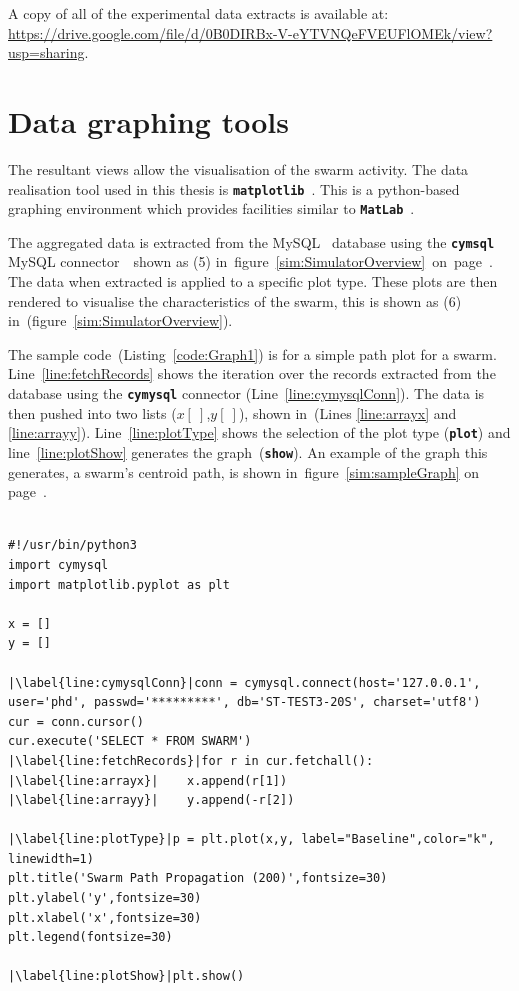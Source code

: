 A copy of all of the experimental data extracts is available at: \url{https://drive.google.com/file/d/0B0DIRBx-V-eYTVNQeFVEUFlOMEk/view?usp=sharing}.

\section{Data graphing tools}\label{sim:GraphingTools}
The resultant views allow the visualisation of the swarm activity. The data realisation tool used in this thesis is \texttt{\textbf{matplotlib}}~\cite{JH:16}. This is a python-based graphing environment which provides facilities similar to \texttt{\textbf{MatLab}}~\cite{MATLAB:94}. 

The aggregated data is extracted from the MySQL~\cite{OC:16} database using the \texttt{\textbf{cymsql}} MySQL connector~\cite{PSF:15}~shown as (5) in~figure~\ref{sim:SimulatorOverview}~on~page~\pageref{sim:SimulatorOverview}. The data when extracted is applied to a specific plot type. These plots are then rendered to visualise the characteristics of the swarm, this is shown as (6) in~(figure~\ref{sim:SimulatorOverview}).

The sample code~(Listing~\ref{code:Graph1}) is for a simple path plot for a swarm. Line~\ref{line:fetchRecords} shows the iteration over the records extracted from the database using the \texttt{\textbf{cymysql}} connector (Line~\ref{line:cymysqlConn}). The data is then pushed into two lists ($x[~]$,$y[~]$), shown in~(Lines \ref{line:arrayx} and \ref{line:arrayy}). Line~\ref{line:plotType} shows the selection of the plot type (\texttt{\textbf{plot}}) and line~\ref{line:plotShow} generates the graph~(\texttt{\textbf{show}}). An example of the graph this generates, a swarm's centroid path, is shown in~figure~\ref{sim:sampleGraph} on page~\pageref{sim:sampleGraph}. 

\begin{lstlisting}[label={code:Graph1}]  % Start your code-block

#!/usr/bin/python3
import cymysql
import matplotlib.pyplot as plt

x = []
y = []

|\label{line:cymysqlConn}|conn = cymysql.connect(host='127.0.0.1', user='phd', passwd='*********', db='ST-TEST3-20S', charset='utf8')
cur = conn.cursor()
cur.execute('SELECT * FROM SWARM')
|\label{line:fetchRecords}|for r in cur.fetchall():
|\label{line:arrayx}|    x.append(r[1])
|\label{line:arrayy}|    y.append(-r[2])

|\label{line:plotType}|p = plt.plot(x,y, label="Baseline",color="k", linewidth=1)
plt.title('Swarm Path Propagation (200)',fontsize=30)
plt.ylabel('y',fontsize=30)
plt.xlabel('x',fontsize=30)
plt.legend(fontsize=30)

|\label{line:plotShow}|plt.show()
\end{lstlisting}

